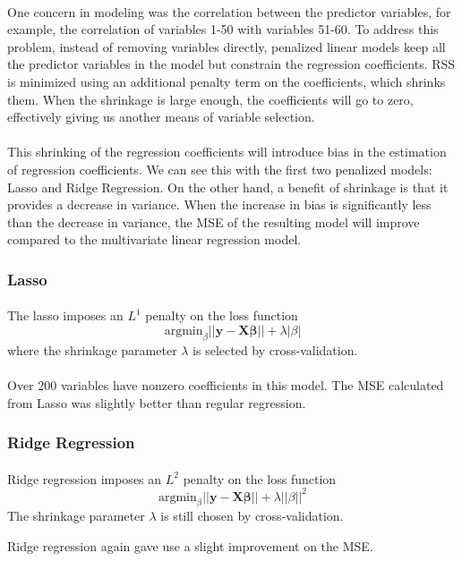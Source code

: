\documentclass[paper=a4, fontsize=11pt]{scrartcl} %
\numberwithin{equation}{section} %
\numberwithin{figure}{section} %
\numberwithin{table}{section} %
\begin{document}
\paragraph{}
 One concern in modeling was the correlation between the predictor variables, for example, the correlation of variables 1-50 with variables 51-60. To address this problem, instead of removing variables directly, penalized linear models keep all the predictor variables in the model but constrain the regression coefficients. RSS is minimized using an additional penalty term on the coefficients, which shrinks them. When the shrinkage is large enough, the coefficients will go to zero, effectively giving us another means of variable selection.

\paragraph{}
 This shrinking of the regression coefficients will introduce bias in the estimation of regression coefficients. We can see this with the first two penalized models: Lasso and Ridge Regression. On the other hand, a benefit of shrinkage is that it provides a decrease in variance. When the increase in bias is significantly less than the decrease in variance, the MSE of the resulting model will improve compared to the multivariate linear regression model.


\subsubsection{Lasso}
\paragraph{}
 The lasso imposes an \(L^{1}\) penalty on the loss function
\[\text{argmin}_{\beta} ||\mathbf{y} - \mathbf{X}\mathbf{\beta}|| + \lambda |\beta|\]
where the shrinkage parameter \(\lambda\) is selected by cross-validation.
\paragraph{}
 Over 200 variables have nonzero coefficients in this model. The MSE calculated from Lasso was slightly better than regular regression.

\subsubsection{Ridge Regression}
\paragraph{}
 Ridge regression imposes an \(L^2\) penalty on the loss function
\[\text{argmin}_{\beta} ||\mathbf{y} - \mathbf{X}\mathbf{\beta}|| + \lambda ||\beta||^2\]
The shrinkage parameter \(\lambda\) is still chosen by cross-validation.
\par Ridge regression again gave use a slight improvement on the MSE.
\end{document}
